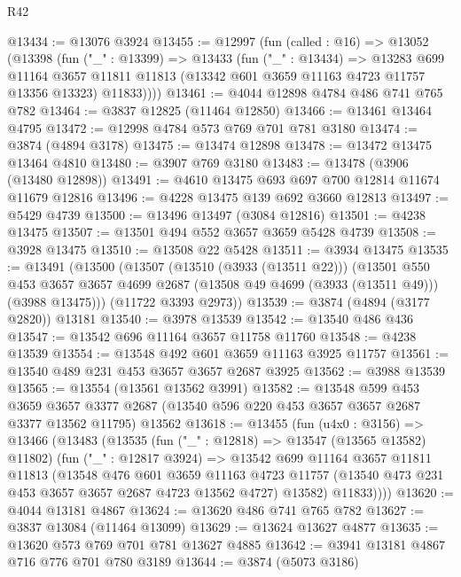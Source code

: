 \begin{lexlean}{R42}
\begin{coremodule}
@13434 := @13076 @3924
@13455 := @12997
    (fun (called : @16) =>
    @13052
      (@13398
        (fun ("_" : @13399) =>
        @13433
          (fun ("_" : @13434) =>
          @13283
            @699
            @11164
            @3657
            @11811
            @11813
            (@13342 @601 @3659 @11163 @4723 @11757 @13356 @13323)
            @11833))))
@13461 := @4044 @12898 @4784 @486 @741 @765 @782
@13464 := @3837 @12825 (@11464 @12850)
@13466 := @13461 @13464 @4795
@13472 := @12998 @4784 @573 @769 @701 @781 @3180
@13474 := @3874 (@4894 @3178)
@13475 := @13474 @12898
@13478 := @13472 @13475 @13464 @4810
@13480 := @3907 @769 @3180
@13483 := @13478 (@3906 (@13480 @12898))
@13491 := @4610 @13475 @693 @697 @700 @12814 @11674 @11679 @12816
@13496 := @4228 @13475 @139 @692 @3660 @12813
@13497 := @5429 @4739
@13500 := @13496 @13497 (@3084 @12816)
@13501 := @4238 @13475
@13507 := @13501 @494 @552 @3657 @3659 @5428 @4739
@13508 := @3928 @13475
@13510 := @13508 @22 @5428
@13511 := @3934 @13475
@13535 := @13491
    (@13500
      (@13507
        (@13510 (@3933 (@13511 @22)))
        (@13501
          @550
          @453
          @3657
          @3657
          @4699
          @2687
          (@13508 @49 @4699 (@3933 (@13511 @49)))
          (@3988 @13475)))
      (@11722 @3393 @2973))
@13539 := @3874 (@4894 (@3177 @2820)) @13181
@13540 := @3978 @13539
@13542 := @13540 @486 @436
@13547 := @13542 @696 @11164 @3657 @11758 @11760
@13548 := @4238 @13539
@13554 := @13548 @492 @601 @3659 @11163 @3925 @11757
@13561 := @13540 @489 @231 @453 @3657 @3657 @2687 @3925
@13562 := @3988 @13539
@13565 := @13554 (@13561 @13562 @3991)
@13582 := @13548
    @599
    @453
    @3659
    @3657
    @3377
    @2687
    (@13540 @596 @220 @453 @3657 @3657 @2687 @3377 @13562 @11795)
    @13562
@13618 := @13455
    (fun (u4x0 : @3156) =>
    @13466
      (@13483
        (@13535
          (fun ("_" : @12818) => @13547 (@13565 @13582) @11802)
          (fun ("_" : @12817 @3924) =>
          @13542
            @699
            @11164
            @3657
            @11811
            @11813
            (@13548
              @476
              @601
              @3659
              @11163
              @4723
              @11757
              (@13540 @473 @231 @453 @3657 @3657 @2687 @4723 @13562 @4727)
              @13582)
            @11833))))
@13620 := @4044 @13181 @4867
@13624 := @13620 @486 @741 @765 @782
@13627 := @3837 @13084 (@11464 @13099)
@13629 := @13624 @13627 @4877
@13635 := @13620 @573 @769 @701 @781 @13627 @4885
@13642 := @3941 @13181 @4867 @716 @776 @701 @780 @3189
@13644 := @3874 (@5073 @3186)

\end{coremodule}
\end{lexlean}
